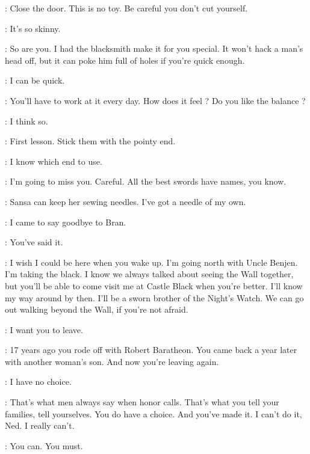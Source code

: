 \JON: Close the door. This is no toy. Be careful you don't cut yourself. 

\ARYA: It's so skinny. 

\JON: So are you. I had the blacksmith make it for you special. It won't hack a man's head off, but it can poke him full of holes if you're quick enough. 

\ARYA: I can be quick. 

\JON: You'll have to work at it every day. How does it feel ? Do you like the balance ? 

\ARYA: I think so. 

\JON: First lesson. Stick them with the pointy end. 

\ARYA: I know which end to use. 

\JON: I'm going to miss you.  Careful.  All the best swords have names, you know. 

\ARYA: Sansa can keep her sewing needles. I've got a needle of my own. 

\scene



\JON: I came to say goodbye to Bran. 

\CATELYN: You've said it. 

\JON: I wish I could be here when you wake up. I'm going north with Uncle Benjen. I'm taking the black. I know we always talked about seeing the Wall together, but you'll be able to come visit me at Castle Black when you're better. I'll know my way around by then. I'll be a sworn brother of the Night's Watch. We can go out walking beyond the Wall, if you're not afraid. 


\CATELYN: I want you to leave. 


\CATELYN: 17 years ago you rode off with Robert Baratheon. You came back a year later with another woman's son. And now you're leaving again. 

\NED: I have no choice. 

\CATELYN: That's what men always say when honor calls. That's what you tell your families, tell yourselves. You do have a choice. And you've made it. I can't do it, Ned. I really can't. 

\NED: You can. You must. 

